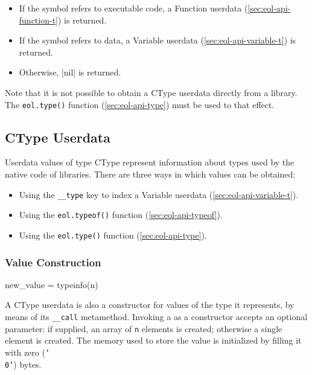 \begin{itemize}

	\item If the symbol refers to executable code, a \textsf{Function} userdata
	(\autoref{sec:eol-api-function-t}) is returned.

	\item If the symbol refers to data, a \textsf{Variable} userdata
	(\autoref{sec:eol-api-variable-t}) is returned.

	\item Otherwise, \Mlua|nil| is returned.

\end{itemize}

Note that it is not possible to obtain a \textsf{CType} userdata directly from
a library. The \texttt{eol.type()} function (\autoref{sec:eol-api-type}) must
be used to that effect.


\subsection{CType Userdata}
	\label{sec:eol-api-ctype-t}

Userdata values of type \textsf{CType} represent information about types used
by the native code of libraries. There are three ways in which values can be
obtained:

\begin{itemize}

	\item Using the \texttt{\_\_type} key to index a \textsf{Variable}
	userdata (\autoref{sec:eol-api-variable-t}).

	\item Using the \texttt{eol.typeof()} function
	(\autoref{sec:eol-api-typeof}).

	\item Using the \texttt{eol.type()} function (\autoref{sec:eol-api-type}).

\end{itemize}


\subsubsection{Value Construction}

\begin{luacode}
new_value = typeinfo(n)
\end{luacode}

A \textsf{CType} userdata is also a \gls{constructor} for values of the type
it represents, by means of its \texttt{\_\_call} metamethod. Invoking
a \value{CType} as a constructor accepts an optional parameter: if supplied,
an array of \texttt{n} elements is created; otherwise a single element is
created. The memory used to store the value is initialized by filling it with
zero (\texttt{'\\0'}) bytes.

